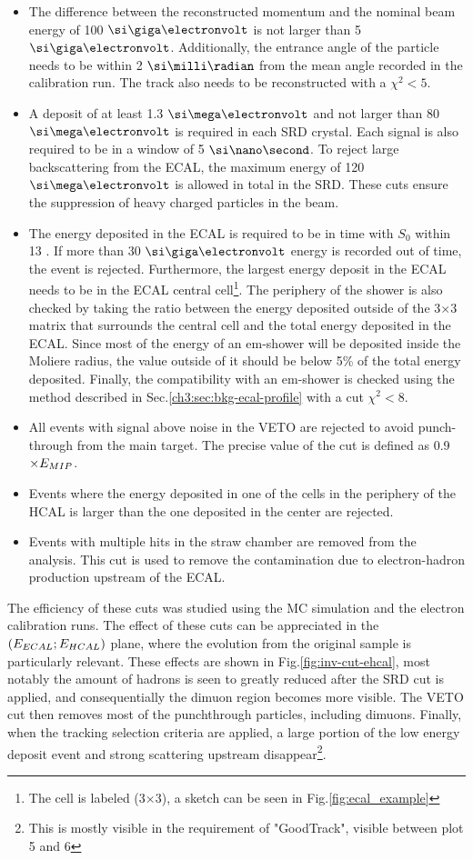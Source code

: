 \begin{itemize}
\item The difference between the reconstructed momentum and the nominal beam energy of 100 $\gev$ is not larger than 5 $\gev$. Additionally, the entrance angle of the particle needs to be within 2 $\mrad$ from the mean angle recorded in the calibration run. The track also needs to be reconstructed with a $\chi^2<5$.
\item A deposit of at least 1.3 $\mev$ and not larger than 80 $\mev$ is required in each SRD crystal. Each signal is also required to be in a window of 5 $\nas$. To reject large backscattering from the ECAL, the maximum energy of 120 $\mev$ is allowed in total in the SRD. These cuts ensure the suppression of heavy charged particles in the beam.
\item The energy deposited in the ECAL is required to be in time with $S_0$ within 13 \nas. If more than 30 $\gev$ energy is recorded out of time, the event is rejected. Furthermore, the largest energy deposit in the ECAL needs to be in the ECAL central cell\footnote{The cell is labeled (3$\times$3), a sketch can be seen in Fig.\ref{fig:ecal_example}}. The periphery of the shower is also checked by taking the ratio between the energy deposited outside of the 3$\times$3 matrix that surrounds the central cell and the total energy deposited in the ECAL. Since most of the energy of an em-shower will be deposited inside the Moliere radius, the value outside of it should be below 5\% of the total energy deposited. Finally, the compatibility with an em-shower is checked using the method described in Sec.\ref{ch3:sec:bkg-ecal-profile} with a cut $\chi^2 < 8$.
\item All events with signal above noise in the VETO are rejected to avoid punch-through from the main target. The precise value of the cut is defined as 0.9$\times E_{MIP}$.
\item Events where the energy deposited in one of the cells in the periphery of the HCAL is larger than the one deposited in the center are rejected.
\item Events with multiple hits in the straw chamber are removed from the analysis. This cut is used to remove the contamination due to electron-hadron production upstream of the ECAL.
\end{itemize}

The efficiency of these cuts was studied using the MC simulation and the electron calibration runs.
The effect of these cuts can be appreciated in the $(E_{ECAL};E_{HCAL})$ plane, where the evolution from the original sample is particularly relevant. These effects are shown in Fig.\ref{fig:inv-cut-ehcal}, most notably the amount of hadrons is seen to greatly reduced after the SRD cut is applied, and consequentially the dimuon region becomes more visible. The VETO cut then removes most of the punchthrough particles, including dimuons. Finally, when the tracking selection criteria are applied, a large portion of the low energy deposit event and strong scattering upstream disappear\footnote{This is mostly visible in the requirement of "GoodTrack", visible between plot 5 and 6}.


